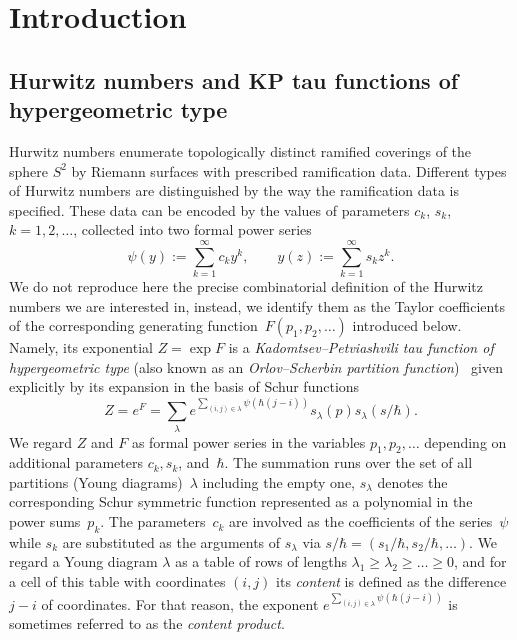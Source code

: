 \documentclass[11pt]{article}
\theoremstyle{plain}
\theoremstyle{definition}
\theoremstyle{remark}
\begin{document}
\section{Introduction}

\subsection{Hurwitz numbers and KP tau functions of hypergeometric type}

Hurwitz numbers enumerate topologically distinct ramified coverings of the sphere $S^2$ by \hbox{Riemann} surfaces with prescribed ramification data. Different types of Hurwitz numbers are distinguished by the way the ramification data is specified. These data can be encoded by the values of parameters $c_k$, $s_k$, $k=1,2,\dots$, collected into two formal power series\vspace*{-5pt}
\begin{equation}\label{eq:psiY}
\psi(y):=\sum_{k=1}^\infty c_k y^k,\qquad
y(z):=\sum_{k=1}^\infty s_k z^k.
\end{equation}
We do not reproduce here the precise combinatorial definition of the Hurwitz numbers we are interested in, instead, we identify them as the Taylor coefficients of the corresponding generating function~$F(p_1,p_2,\dots)$ introduced below. Namely, its exponential $Z=\exp F$ is a \emph{Kadomtsev--Petviashvili tau function of hypergeometric type} (also known as an \emph{Orlov--Scherbin partition function})~\cite{Kharchev,OrlovScherbin,OrlovScherbin-2} given explicitly by its expansion in the basis of Schur functions
\begin{equation}\label{eq:OS}
Z=e^{F}=\sum_\lambda e^{\sum_{(i,j)\in\lambda}\psi(\hbar(j-i))}s_\lambda(p)s_\lambda(s/\hbar).
\end{equation}
We regard $Z$ and $F$ as formal power series in the variables $p_1,p_2,\dots$ depending on additional parameters $c_k, s_k$, and~$\hbar$.
The summation runs over the set of all partitions (Young diagrams)~$\lambda$ including the empty one, $s_\lambda$ denotes the corresponding Schur symmetric function represented as a polynomial in the power sums~$p_k$. The parameters~$c_k$ are involved as the coefficients of the series~$\psi$ while $s_k$ are substituted as the arguments of $s_\lambda$ via $s/\hbar=(s_1/\hbar,s_2/\hbar,\dots)$. We regard a Young diagram $\lambda$ as a table of rows of lengths $\lambda_1\ge\lambda_2\ge\dots\ge0$, and for a cell of this table with coordinates $(i,j)$ its \emph{content} is defined as the difference $j-i$ of coordinates. For that reason, the exponent $e^{\sum_{(i,j)\in\lambda}\psi(\hbar(j-i))}$ is sometimes referred to as the \emph{content product}.
\end{document}
